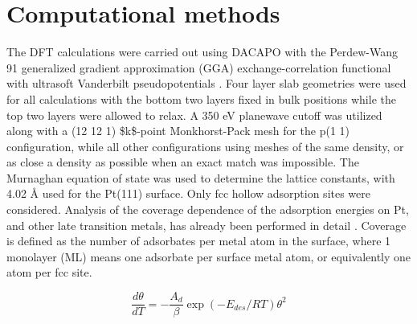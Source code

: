 \documentclass{svjour3}
\begin{document}
\section{Computational methods}
\label{sec:orgf384698}
The DFT calculations were carried out using DACAPO \cite{hammer1999} with the Perdew-Wang 91 generalized gradient approximation (GGA) exchange-correlation functional \cite{perdew1992} with ultrasoft Vanderbilt pseudopotentials \cite{vanderbilt1990}.  Four layer slab geometries were used for all calculations with the bottom two layers fixed in bulk positions while the top two layers were allowed to relax.  A 350 eV planewave cutoff was utilized along with a (12 \texttimes{} 12 \texttimes{} 1) \$k\$-point Monkhorst-Pack mesh for the p(1 \texttimes{} 1) configuration, while all other configurations using meshes of the same density, or as close a density as possible when an exact match was impossible.  The Murnaghan equation of state \cite{murnaghan1944}  was used to determine the lattice constants, with 4.02 \AA{} used for the Pt(111) surface.  Only fcc hollow adsorption sites were considered.  Analysis of the coverage dependence of the adsorption energies on Pt, and other late transition metals, has already been performed in detail \cite{tang2004,getman2008,miller2011}. Coverage is defined as the number of adsorbates per metal atom in the surface, where 1 monolayer (ML) means one adsorbate per surface metal atom, or equivalently one atom per fcc site.



\begin{equation} 
\frac{d\theta}{dT} = -\frac{A_d}{\beta}\exp(-E_{des}/RT) \theta^2 \label{eq:balance}
\end{equation}
\end{document}

